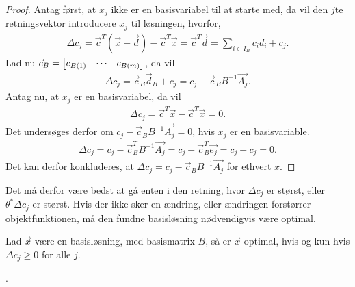 \begin{proof}
Antag først, at $x_j$ ikke er en basisvariabel til at starte med, da vil den $j$te retningsvektor introducere $x_j$ til løsningen, hvorfor,
\begin{align*}
\Delta c_j = \vec{c}^T(\vec{x}+ \vec{d}) - \vec{c}^T\vec{x} = \vec{c}^T\vec{d} = \sum_{i \in I_B} c_i d_i + c_j.
\end{align*}
Lad nu $\vec{c}_B = \begin{bmatrix} c_{B(1)}& \cdots & c_{B(m)} \end{bmatrix}$, da vil
\begin{align}
\Delta c_j =\vec{c}_B\vec{d}_B+ c_j = c_j-\vec{c}_B B^{-1}\vec{A_j}.
\end{align}
Antag nu, at $x_j$ er en basisvariabel, da vil 
\begin{align*}
\Delta c_j = \vec{c}^T\vec{x}- \vec{c}^T\vec{x} = 0.
\end{align*}
Det undersøges derfor om $ c_j-\vec{c}_B B^{-1}\vec{A_j}= 0$, hvis $x_j$ er en basisvariable.
\begin{align*}
 \Delta c_j = c_j-\vec{c}_B^T B^{-1}\vec{A_j} = c_j - \vec{c}_B^T \vec{e_j} = c_j - c_j = 0.
\end{align*}
Det kan derfor konkluderes, at $\Delta c_j = c_j-\vec{c}_B B^{-1}\vec{A_j}$ for ethvert $x$.
\end{proof}

Det må derfor være bedst at gå enten i den retning, hvor $\Delta c_j$ er størst, eller $\theta^*\Delta c_j$ er størst. 
Hvis der ikke sker en ændring, eller ændringen forstørrer objektfunktionen, må den fundne basisløsning nødvendigvis være optimal.

\begin{stn}
Lad $\vec{x}$ være en basisløsning, med basismatrix $B$, så er $\vec{x}$ optimal, hvis og kun hvis $\Delta c_j \geq 0$ for alle $j$.
\label{stn:optimalDeltaC}
\end{stn}.

